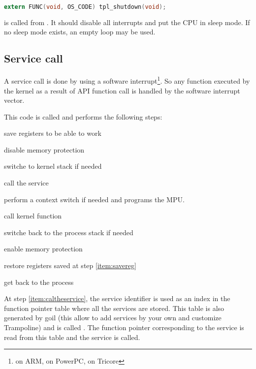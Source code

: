 
\begin{lstlisting}[language=C]
extern FUNC(void, OS_CODE) tpl_shutdown(void);
\end{lstlisting}

 is called from . It should disable all interrupts and put the CPU in sleep mode. If no sleep mode exists, an empty loop may be used.


\subsection{Service call}

A service call is done by using a software interrupt\footnote{ on ARM,  on PowerPC,  on Tricore}. So any function executed by the kernel as a result of API function call is handled by the software interrupt vector.

This code is called  and performs the following steps:

\begin{penum}
\item save registers to be able to work \label{item:savereg}
\item disable memory protection
\item switche to kernel stack if needed
\item call the service \label{item:caltheservice}
\item perform a context switch if needed and programs the MPU.
\item call kernel function 
\item switche back to the process stack if needed
\item enable memory protection
\item restore registers saved at step \ref{item:savereg}
\item get back to the process
\end{penum}

At step \ref{item:caltheservice}, the service identifier is used as an index in the function pointer table where all the services are stored. This table is also generated by goil (this allow to add services by your own and customize Trampoline) and is called . The function pointer corresponding to the service is read from this table and the service is called.

